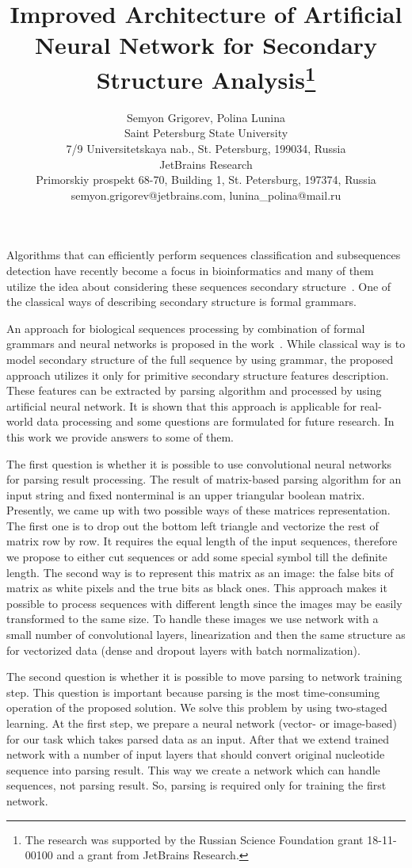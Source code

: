 \documentclass[12pt]{article}  %
\title{Improved Architecture of Artificial Neural Network for Secondary Structure Analysis\footnote{The research was supported by the Russian Science Foundation grant 18-11-00100 and a grant from JetBrains Research.}}
\author{Semyon Grigorev, Polina Lunina
\\ 
       \small{Saint Petersburg State University}\\
       \small{7/9 Universitetskaya nab., St. Petersburg, 199034, Russia}\\
       \small{JetBrains Research}\\
       \small{Primorskiy prospekt 68-70, Building 1, St. Petersburg, 197374, Russia} \\
       \small{semyon.grigorev@jetbrains.com, lunina\_polina@mail.ru}
       }
\date{}
\theoremstyle{definition}
\theoremstyle{remark}
\begin{document}
\maketitle
Algorithms that can efficiently perform sequences classification and subsequences detection have recently become a focus in bioinformatics and many of them utilize the idea about considering these sequences secondary structure~\cite{GrammarsRNA, PCFG, meta, LWPCFG}. One of the classical ways of describing secondary structure is formal grammars.

An approach for biological sequences processing by combination of formal grammars and neural networks is proposed in the work~\cite{grigorevcomposition}.
While classical way is to model secondary structure of the full sequence by using grammar, the proposed approach utilizes it only for primitive secondary structure features description. These features can be extracted by parsing algorithm and processed by using artificial neural network. It is shown that this approach is applicable for real-world data processing and some questions are formulated for future research. In this work we provide answers to some of them.  

The first question is whether it is possible to use convolutional neural networks for parsing result processing. The result of matrix-based parsing algorithm for an input string and fixed nonterminal is an upper triangular boolean matrix. Presently, we came up with two possible ways of these matrices representation. The first one is to drop out the bottom left triangle and vectorize the rest of matrix row by row. It requires the equal length of the input sequences, therefore we propose to either cut sequences or add some special symbol till the definite length. The second way is to represent this matrix as an image: the false bits of matrix as white pixels and the true bits as black ones. This approach makes it possible to process sequences with different length since the images may be easily transformed to the same size. To handle these images we use network with a small number of convolutional layers, linearization and then the same structure as for vectorized data (dense and dropout layers with batch normalization).

The second question is whether it is possible to move parsing to network training step. This question is important because parsing is the most time-consuming operation of the proposed solution. We solve this problem by using two-staged learning. At the first step, we prepare a neural network (vector- or image-based) for our task which takes parsed data as an input. After that we extend trained network with a number of input layers that should convert original nucleotide sequence into parsing result. This way we create a network which can handle sequences, not parsing result. So, parsing is required only for training the first network.
\end{document}
